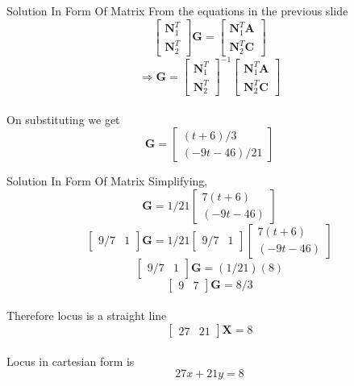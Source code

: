 \documentclass{beamer}
\begin{document}
\begin{frame}{Solution In Form Of Matrix}
From the equations in the previous slide
\\\[\begin{bmatrix}\textbf{N}_1^T \\ \textbf{N}_2^T\end{bmatrix}\textbf{G} = \begin{bmatrix}\textbf{N}_1^T\textbf{A} \\ \textbf{N}_2^T\textbf{C}\end{bmatrix}\]
\[\Rightarrow \textbf{G} = \begin{bmatrix}\textbf{N}_1^T \\ \textbf{N}_2^T\end{bmatrix}^{-1}\begin{bmatrix}\textbf{N}_1^T\textbf{A} \\ \textbf{N}_2^T\textbf{C}\end{bmatrix}\]
\\On substituting we get
\[\textbf{G} = \begin{bmatrix}(t+6)/3 \\ (-9t-46)/21\end{bmatrix}\]
\end{frame}
\begin{frame}{Solution In Form Of Matrix}
Simplifying,
\[\textbf{G} = 1/21\begin{bmatrix}7(t+6) \\ (-9t-46)\end{bmatrix}\]
\[\begin{bmatrix}9/7 & 1\end{bmatrix}\textbf{G} = 1/21\begin{bmatrix}9/7 & 1\end{bmatrix}\begin{bmatrix}7(t+6) \\ (-9t-46)\end{bmatrix}\]
\[\begin{bmatrix}9/7 & 1\end{bmatrix}\textbf{G} = (1/21)(8)\]
\[\begin{bmatrix}9 & 7\end{bmatrix}\textbf{G} = 8/3\]
\\Therefore locus is a straight line
\[\begin{bmatrix}27 & 21\end{bmatrix}\textbf{X} = 8\]
\\Locus in cartesian form is
\[27x + 21y = 8\]
\end{frame}
\end{document}
